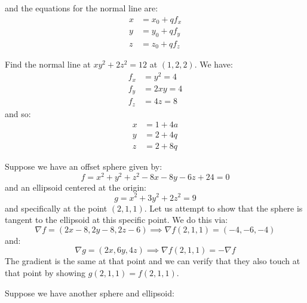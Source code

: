 \begin{itemize}
\begin{example}
\begin{equation}
        \end{equation}
        and the equations for the normal line are:
        \begin{align}
            x &= x_0 + qf_x \\ 
            y &= y_0 + qf_y \\ 
            z &= z_0 + qf_z
        \end{align}
    \end{example}
    \begin{example}
        Find the normal line at $xy^2+2z^2=12$ at $(1,2,2)$. We have:
        \begin{align}
            f_x &= y^2 = 4 \\ 
            f_y &= 2xy = 4 \\ 
            f_z &= 4z = 8
        \end{align}
        and so:
        \begin{align}
            x &= 1 + 4a \\ 
            y &= 2+4q \\ 
            z &= 2+8q
        \end{align}
    \end{example}
    \begin{example}
        Suppose we have an offset sphere given by:
        \begin{equation}
            f = x^2+y^2+z^2-8x-8y-6z+24=0
        \end{equation}
        and an ellipsoid centered at the origin:
        \begin{equation}
            g = x^2+3y^2+2z^2=9
        \end{equation}
        and specifically at the point $(2,1,1)$. Let us attempt to show that the sphere is tangent to the ellipsoid at this specific point. We do this via:
        \begin{equation}
            \nabla f = (2x-8, 2y-8, 2z-6) \implies \nabla f(2,1,1)=(-4,-6,-4)
        \end{equation}
        and:
        \begin{equation}
            \nabla g = (2x,6y,4z) \implies \nabla f(2,1,1)=-\nabla f
        \end{equation}
        The gradient is the same at that point and we can verify that they also touch at that point by showing $g(2,1,1)=f(2,1,1)$. 
    \end{example}
    \begin{example}
        Suppose we have another sphere and ellipsoid:

\end{example}
\end{itemize}
